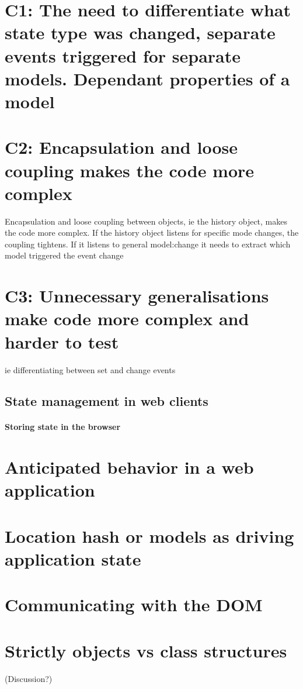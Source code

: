 \documentclass[english]{ifimaster}
\begin{document}
\section{C1: The need to differentiate what state type was changed, separate events triggered for separate models. Dependant properties of a model}
\section{C2: Encapsulation and loose coupling makes the code more complex}
Encapsulation and loose coupling between objects, ie the history object, makes the code more complex. If the history object listens for specific mode changes, the coupling tightens. If it listens to general model:change it needs to extract which model triggered the event change
\section{C3: Unnecessary generalisations make code more complex and harder to test}
ie differentiating between set and change events




\subsection{State management in web clients}
\paragraph{Storing state in the browser}

\section{Anticipated behavior in a web application}
\section{Location hash or models as driving application state}

\section{Communicating with the DOM}

\section{Strictly objects vs class structures} (Discussion?)
\end{document}
